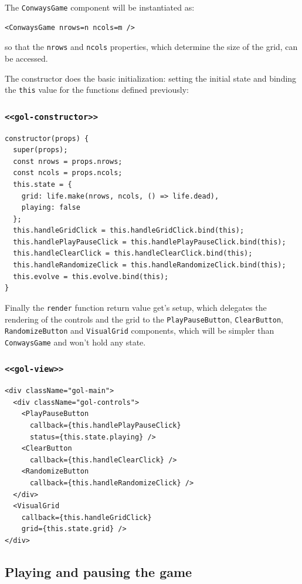 \documentclass[11pt]{article}
\begin{document}
The \texttt{ConwaysGame} component will be instantiated as:
\begin{verbatim}
<ConwaysGame nrows=n ncols=m />
\end{verbatim}
so that the \texttt{nrows} and \texttt{ncols} properties, which determine the size of the grid, can be accessed.

The constructor does the basic initialization: setting the initial state and binding the \texttt{this} value for the functions defined previously:

\subsubsection{\texttt{<<gol-constructor>>}}
\label{sec:orgf7c4353}
\begin{verbatim}
constructor(props) {
  super(props);
  const nrows = props.nrows;
  const ncols = props.ncols;
  this.state = {
    grid: life.make(nrows, ncols, () => life.dead),
    playing: false
  };
  this.handleGridClick = this.handleGridClick.bind(this);
  this.handlePlayPauseClick = this.handlePlayPauseClick.bind(this);
  this.handleClearClick = this.handleClearClick.bind(this);
  this.handleRandomizeClick = this.handleRandomizeClick.bind(this);
  this.evolve = this.evolve.bind(this);
}
\end{verbatim}

Finally the \texttt{render} function return value get's setup, which delegates the rendering of the controls and the grid to the \texttt{PlayPauseButton}, \texttt{ClearButton}, \texttt{RandomizeButton} and \texttt{VisualGrid} components, which will be simpler than \texttt{ConwaysGame} and won't hold any state.

\subsubsection{\texttt{<<gol-view>>}}
\label{sec:orga70f4d1}
\begin{verbatim}
<div className="gol-main">
  <div className="gol-controls">
    <PlayPauseButton
      callback={this.handlePlayPauseClick}
      status={this.state.playing} />
    <ClearButton
      callback={this.handleClearClick} />
    <RandomizeButton
      callback={this.handleRandomizeClick} />
  </div>
  <VisualGrid
    callback={this.handleGridClick}
    grid={this.state.grid} />
</div>
\end{verbatim}

\subsection{Playing and pausing the game}
\label{sec:org5ccf4c6}
\end{document}
